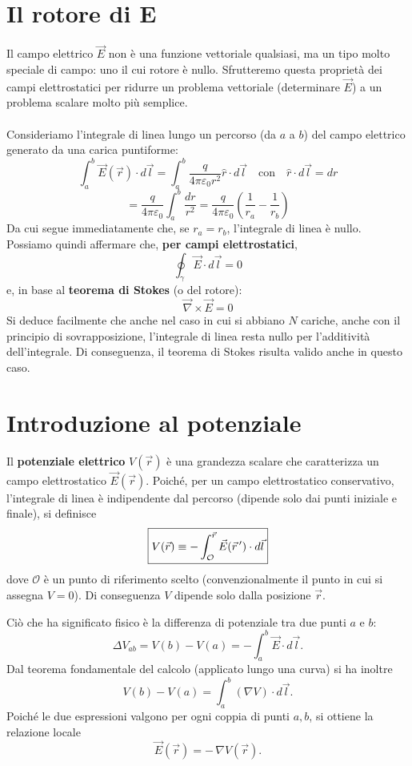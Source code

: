 \documentclass{book}
\begin{document}
\section{Il rotore di E}
Il campo elettrico $\vec{E}$ non è una funzione vettoriale qualsiasi, ma un tipo molto speciale di campo: uno il cui rotore è nullo.  
Sfrutteremo questa proprietà dei campi elettrostatici per ridurre un problema vettoriale (determinare $\vec{E}$) a un problema scalare molto più semplice.
\\
\\
Consideriamo l’integrale di linea lungo un percorso (da $a$ a $b$) del campo elettrico generato da una carica puntiforme:
\[
\int_a^b \vec{E}(\vec{r}) \cdot d\vec{l} 
= \int_a^b \frac{q}{4\pi \varepsilon_0 r^2} \hat{r} \cdot d\vec{l} 
\quad \text{con} \quad \hat{r} \cdot d\vec{l} = dr
\]
\[
= \frac{q}{4\pi \varepsilon_0} \int_a^b \frac{dr}{r^2} 
= \frac{q}{4\pi \varepsilon_0} \left( \frac{1}{r_a} - \frac{1}{r_b} \right)
\]
Da cui segue immediatamente che, se $r_a = r_b$, l’integrale di linea è nullo.  
Possiamo quindi affermare che, \textbf{per campi elettrostatici},
\[
\oint_{\gamma} \vec{E} \cdot d\vec{l} = 0
\]
e, in base al \textbf{teorema di Stokes} (o del rotore):
\[
\boxed{
\vec{\nabla} \times \vec{E} = 0
}
\]
Si deduce facilmente che anche nel caso in cui si abbiano $N$ cariche, anche con il principio di sovrapposizione, l’integrale di linea resta nullo per l’additività dell’integrale.  
Di conseguenza, il teorema di Stokes risulta valido anche in questo caso.

\section{Introduzione al potenziale}

Il \textbf{potenziale elettrico} \(V(\vec r)\) è una grandezza scalare che caratterizza un campo elettrostatico \(\vec{E}(\vec r)\).
Poiché, per un campo elettrostatico conservativo, l'integrale di linea è indipendente dal percorso (dipende solo dai punti iniziale e finale), si definisce
\[
\boxed{%
V(\vec{r}) \equiv - \int_{\mathcal{O}}^{\vec{r}} \vec{E}(\vec{r}\,') \cdot d\vec{l}
}
\]
dove \(\mathcal{O}\) è un punto di riferimento scelto (convenzionalmente il punto in cui si assegna \(V=0\)). Di conseguenza \(V\) dipende solo dalla posizione \(\vec r\).

Ciò che ha significato fisico è la differenza di potenziale tra due punti \(a\) e \(b\):
\[
\Delta V_{ab} = V(b)-V(a) = -\int_{a}^{b} \vec{E}\cdot d\vec{l}.
\]
Dal teorema fondamentale del calcolo (applicato lungo una curva) si ha inoltre
\[
V(b)-V(a)=\int_{a}^{b} (\nabla V)\cdot d\vec{l}.
\]
Poiché le due espressioni valgono per ogni coppia di punti \(a,b\), si ottiene la relazione locale
\[
\boxed{\vec{E}(\vec r) = -\,\nabla V(\vec r).}
\]
\end{document}
